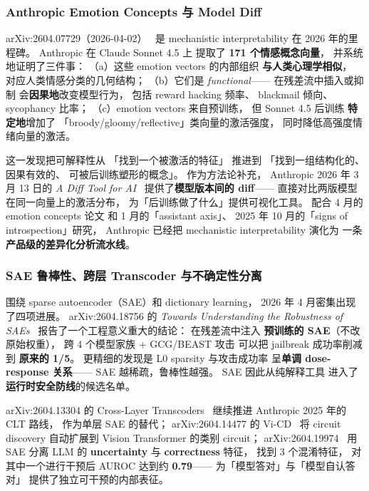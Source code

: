 \subsubsection{Anthropic Emotion Concepts 与 Model Diff}

arXiv:2604.07729（2026-04-02）~\cite{anthropicemotion2604}
是 mechanistic interpretability 在 2026 年的里程碑。
Anthropic 在 Claude Sonnet 4.5 上
提取了 \textbf{171 个情感概念向量}，
并系统地证明了三件事：
（a）这些 emotion vectors 的内部组织
\textbf{与人类心理学相似}，
对应人类情感分类的几何结构；
（b）它们是 \emph{functional}——
在残差流中插入或抑制
会\textbf{因果地}改变模型行为，
包括 reward hacking 频率、
blackmail 倾向、
sycophancy 比率；
（c）emotion vectors 来自预训练，
但 Sonnet 4.5 后训练
\textbf{特定地}增加了
「broody/gloomy/reflective」类向量的激活强度，
同时降低高强度情绪向量的激活。

这一发现把可解释性从
「找到一个被激活的特征」
推进到
「找到一组结构化的、因果有效的、
可被后训练塑形的概念」。
作为方法论补充，
Anthropic 2026 年 3 月 13 日的
\emph{A Diff Tool for AI}~\cite{anthropicdiff2026}
提供了\textbf{模型版本间的 diff}——
直接对比两版模型在同一向量上的激活分布，
为「后训练做了什么」提供可视化工具。
配合 4 月的 emotion concepts 论文
和 1 月的「assistant axis」、
2025 年 10 月的「signs of introspection」研究，
Anthropic 已经把
mechanistic interpretability 演化为
一条\textbf{产品级的差异化分析流水线}。

\subsubsection{SAE 鲁棒性、跨层 Transcoder 与不确定性分离}

围绕 sparse autoencoder（SAE）和
dictionary learning，
2026 年 4 月密集出现了四项进展。
arXiv:2604.18756 的
\emph{Towards Understanding the Robustness of SAEs}~\cite{saerobust2604}
报告了一个工程意义重大的结论：
在残差流中注入
\textbf{预训练的 SAE}（不改原始权重），
跨 4 个模型家族 + GCG/BEAST 攻击
可以把 jailbreak 成功率削减到 \textbf{原来的 1/5}。
更精细的发现是
L0 sparsity 与攻击成功率
呈\textbf{单调 dose-response 关系}——
SAE 越稀疏，鲁棒性越强。
SAE 因此从纯解释工具
进入了\textbf{运行时安全防线}的候选名单。

arXiv:2604.13304 的 Cross-Layer Transcoders~\cite{crosslayertranscoder2604}
继续推进 Anthropic 2025 年的 CLT 路线，
作为单层 SAE 的替代；
arXiv:2604.14477 的 Vi-CD~\cite{vicd2604}
将 circuit discovery 自动扩展到 Vision Transformer 的类别 circuit；
arXiv:2604.19974~\cite{saeuncertainty2604}
用 SAE 分离 LLM 的 \textbf{uncertainty} 与 \textbf{correctness} 特征，
找到 3 个混淆特征，
对其中一个进行干预后
AUROC 达到约 \textbf{0.79}——
为「模型答对」与「模型自认答对」
提供了独立可干预的内部表征。

